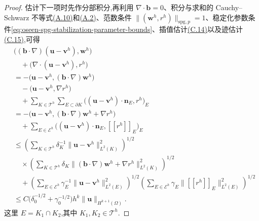 \begin{proof}
估计下一项时先作分部积分,再利用 $\nabla\cdot\bm{b}=0$、积分与求和的 Cauchy--Schwarz 不等式\hyperref[eq:appendix-a-10]{(A.10)}和\hyperref[eq:appendix-a-2]{(A.2)}、范数条件 $\|(\bm{w}^h,r^h)\|_{\mathrm{spg},p}=1$、稳定化参数条件\cref{eq:oseen-spg-stabilization-parameter-bounds}、插值估计\hyperref[eq:interpolation-error-estimate]{(C.14)}以及迹估计\hyperref[eq:appendix-c-15]{(C.15)},可得
\begin{equation}\label{eq:oseen-spg-error-convection}
\begin{aligned}
 &\bigl((\bm{b}\cdot\nabla)(\bm{u}-\bm{v}^h),\bm{w}^h\bigr)\\
 &\quad+\bigl(\nabla\cdot(\bm{u}-\bm{v}^h),r^h\bigr)\\
  &=-\bigl(\bm{u}-\bm{v}^h,
               (\bm{b}\cdot\nabla)\bm{w}^h\bigr)\\
  &\quad-\bigl(\bm{u}-\bm{v}^h,\nabla r^h\bigr)\\
  &\quad+\sum_{K\in\mathcal{T}^h}\sum_{E\subset\partial K}
         \bigl((\bm{u}-\bm{v}^h)\cdot\bm{n}_E,r^h\bigr)_E\\
  &=-\bigl(\bm{u}-\bm{v}^h,
        (\bm{b}\cdot\nabla)\bm{w}^h+\nabla r^h\bigr)\\
  &\quad+\sum_{E\in\mathcal{E}^h}
       \bigl((\bm{u}-\bm{v}^h)\cdot\bm{n}_E,
                     [\![r^h]\!]_E\bigr)_E\\
 &\le\left(\sum_{K\in\mathcal{T}^h}\delta_K^{-1}
        \|\bm{u}-\bm{v}^h\|_{L^2(K)}^2\right)^{1/2}\\
 &\quad\times\left(\sum_{K\in\mathcal{T}^h}\delta_K
        \|(\bm{b}\cdot\nabla)\bm{w}^h+\nabla r^h\|_{L^2(K)}^2
        \right)^{1/2}\\
 &\quad+\left(\sum_{E\in\mathcal{E}^h}\gamma_E^{-1}
       \|\bm{u}-\bm{v}^h\|_{L^2(E)}^2\right)^{1/2}
       \left(\sum_{E\in\mathcal{E}^h}\gamma_E
       \|[\![r^h]\!]_E\|_{L^2(E)}^2\right)^{1/2}\\
 &\le C\bigl(\delta_0^{-1/2}+\gamma_0^{-1/2}\bigr)
       h^k\|\bm{u}\|_{H^{k+1}(\Omega)}.
\end{aligned}
\end{equation}
这里 $E=K_1\cap K_2$,其中 $K_1,K_2\in\mathcal{T}^h$.


\end{proof}
